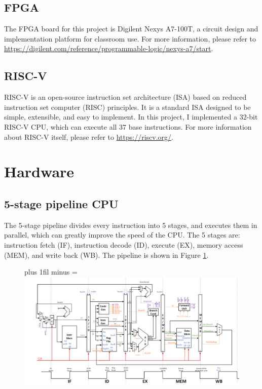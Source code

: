 \documentclass[
	a4paper, %
	11pt, %
]{CSUniSchoolLabReport}
\def\Scentering{\leftskip=0pt plus 1fil minus \Rmargin
                \rightskip=\leftskip}
\begin{document}
\subsection{FPGA}
The FPGA board for this project is Digilent Nexys A7-100T, a circuit design and implementation platform for classroom use. For more information, please refer to \url{https://digilent.com/reference/programmable-logic/nexys-a7/start}.

\subsection{RISC-V}
RISC-V is an open-source instruction set architecture (ISA) based on reduced instruction set computer (RISC) principles. It is a standard ISA designed to be simple, extensible, and easy to implement. In this project, I implemented a 32-bit RISC-V CPU, which can execute all 37 base instructions. For more information about RISC-V itself, please refer to \url{https://riscv.org/}.
\section{Hardware}

\subsection{5-stage pipeline CPU}
The 5-stage pipeline divides every instruction into 5 stages, and executes them in parallel, which can greatly improve the speed of the CPU. The 5 stages are: instruction fetch (IF), instruction decode (ID), execute (EX), memory access (MEM), and write back (WB). The pipeline is shown in Figure \ref{fig:image2}.

\begin{figure}[htbp]
    \Scentering
    \includegraphics[width=.9\paperwidth]{image2.png}
    \caption{}
    \label{fig:image2}
\end{figure}
\end{document}
